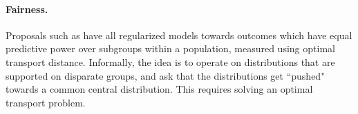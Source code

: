 \paragraph{Fairness.}
Proposals such as 
\citep{jiang2020wasserstein,fairregress,gordaliza2019obtaining} have all 
regularized models towards outcomes which have equal predictive power over subgroups within a population, measured using optimal transport distance.  
Informally, the idea is to operate on 
distributions that are supported on disparate groups, and 
ask that the distributions get ``pushed" towards 
a common central distribution. This requires solving an optimal transport problem.



